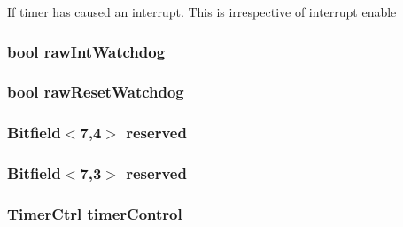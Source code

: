 \label{classCpuLocalTimer_1_1Timer_acae15a5a0ab8900fb06f11e079cf6de2}
If timer has caused an interrupt. This is irrespective of interrupt enable \hypertarget{classCpuLocalTimer_1_1Timer_aa79f4b5f49e12748ddccff650ac434d2}{
\subsubsection[{rawIntWatchdog}]{\setlength{\rightskip}{0pt plus 5cm}bool {\bf rawIntWatchdog}}}
\label{classCpuLocalTimer_1_1Timer_aa79f4b5f49e12748ddccff650ac434d2}
\hypertarget{classCpuLocalTimer_1_1Timer_a891d61f784db1e83addbb06b7487079e}{
\subsubsection[{rawResetWatchdog}]{\setlength{\rightskip}{0pt plus 5cm}bool {\bf rawResetWatchdog}}}
\label{classCpuLocalTimer_1_1Timer_a891d61f784db1e83addbb06b7487079e}
\hypertarget{classCpuLocalTimer_1_1Timer_a6df0c214646b1e43905ffbeea4e8d438}{
\subsubsection[{reserved}]{\setlength{\rightskip}{0pt plus 5cm}Bitfield$<$7,4$>$ {\bf reserved}}}
\label{classCpuLocalTimer_1_1Timer_a6df0c214646b1e43905ffbeea4e8d438}
\hypertarget{classCpuLocalTimer_1_1Timer_a39eaeaf2a0051b75fa1583c0b5c156a0}{
\subsubsection[{reserved}]{\setlength{\rightskip}{0pt plus 5cm}Bitfield$<$7,3$>$ {\bf reserved}}}
\label{classCpuLocalTimer_1_1Timer_a39eaeaf2a0051b75fa1583c0b5c156a0}
\hypertarget{classCpuLocalTimer_1_1Timer_a8a303fd4c61e6f2ad203b3996137bf29}{
\subsubsection[{timerControl}]{\setlength{\rightskip}{0pt plus 5cm}TimerCtrl {\bf timerControl}}}
